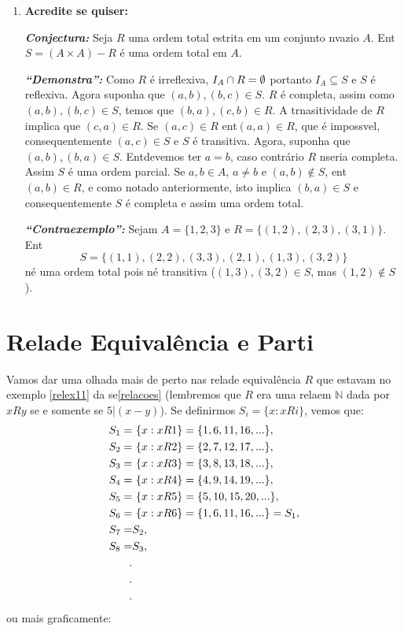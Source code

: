 \begin{enumerate}[{\bf 1.}]
\item {\bf Acredite se quiser:}  

\noindent \textit{\textbf{Conjectura:}} Seja $R$ uma ordem total estrita em um conjunto n\ao vazio $A$. Ent\ao $S=(A\times A)-R$ \'e uma ordem total em $A$. 

\noindent \textit{\textbf{``Demonstra\caoi'':}} Como $R$ \'e irreflexiva, $I_A\cap R=\emptyset$ portanto $I_A\subseteq S$ e $S$ \'e reflexiva. Agora suponha que $(a,b),(b,c)\in S$. $R$ \'e completa, assim como $(a,b),(b,c)\in S$, temos que $(b,a),(c,b)\in R$. A trnasitividade de $R$ implica que $(c,a)\in R$. Se $(a,c)\in R$ ent\ao $(a,a)\in R$, que \'e imposs\ih vel, consequentemente $(a,c)\in S$ e $S$ \'e transitiva. Agora, suponha que $(a,b),(b,a)\in S$. Ent\ao devemos ter $a=b$, caso contr\'ario $R$ n\ao seria completa. Assim $S$ \'e uma ordem parcial. Se $a,b\in A$, $a\neq b$ e $(a,b)\notin S$, ent\ao $(a,b)\in R$, e como notado anteriormente, isto implica $(b,a)\in S$ e consequentemente $S$ \'e completa e assim uma ordem total.

\noindent \textit{\textbf{``Contraexemplo'':}} Sejam $A=\{1,2,3\}$ e $R=\{(1,2),(2,3),(3,1)\}$. Ent\ao
\[
S=\{(1,1),(2,2),(3,3),(2,1),(1,3),(3,2)\}
\]
n\ao \'e uma ordem total pois n\ao \'e transitiva ($(1,3),(3,2)\in S$, mas $(1,2)\notin S$).
\end{enumerate}

\section{Rela\coes de Equival\^encia e Parti\cois}\label{equivalencia}

Vamos dar uma olhada mais de perto nas rela\coes de equival\^encia $R$ que estavam no exemplo \ref{relex11} da se\cao \ref{relacoes} (lembremos que $R$ era uma rela\cao em $\mathbb{N}$ dada por $xRy$ se e somente se $5|(x-y)$). Se definirmos $S_i=\{x: xRi\}$, vemos que:
\begin{equation*}
 \begin{aligned}
S_1=&\textrm{ }\{x: xR1\}=\{1,6,11,16,...\},\\
S_2=&\textrm{ }\{x: xR2\}=\{2,7,12,17,...\},\\
S_3=&\textrm{ }\{x: xR3\}=\{3,8,13,18,...\},\\
S_4=&\textrm{ }\{x: xR4\}=\{4,9,14,19,...\},\\
S_5=&\textrm{ }\{x: xR5\}=\{5,10,15,20,...\},\\
S_6=&\textrm{ }\{x: xR6\}=\{1,6,11,16,...\}=S_1,\\
S_7=&S_2,\\
S_8=&S_3,\\
.\\
.\\
.\\
 \end{aligned}
\end{equation*}
ou mais graficamente:

